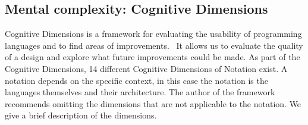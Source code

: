 \subsection{Mental complexity: Cognitive Dimensions}\label{cognitivedimensions}

Cognitive Dimensions is a framework for evaluating the usability of programming
languages and to find areas of improvements.~\cite{GREEN1996131} It allows us to
evaluate the quality of a design and explore what future improvements could be
made. As part of the Cognitive Dimensions, 14 different Cognitive Dimensions of
Notation exist. A notation depends on the specific context, in this case the
notation is the languages themselves and their architecture. The author of the
framework recommends omitting the dimensions that are not applicable to the
notation. We give a brief description of the dimensions.

